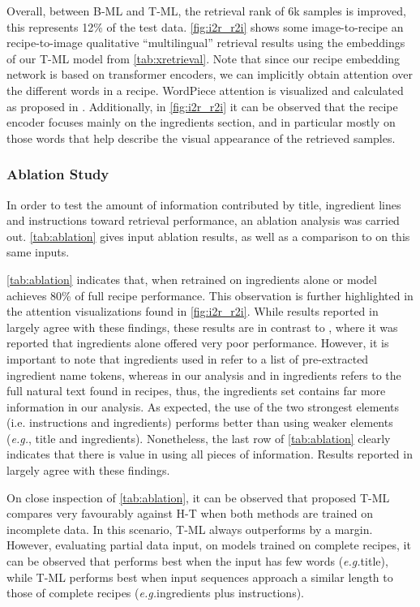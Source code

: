 \documentclass[sigconf,nonacm]{acmart}
\def\eg{\emph{e.g.}} \def\Eg{\emph{E.g.}}
\begin{document}
Overall, between B-ML and T-ML, the retrieval rank of 6k samples is improved, this represents 12\% of the test data. \autoref{fig:i2r_r2i} shows some image-to-recipe an recipe-to-image qualitative ``multilingual'' retrieval results using the embeddings of our  
T-ML model from \autoref{tab:xretrieval}. Note that since our recipe embedding network is based on transformer encoders, we can implicitly obtain attention over the different words in a recipe. WordPiece attention is visualized and calculated as proposed in \cite{Abnar2020}. Additionally, in \autoref{fig:i2r_r2i} it can be observed that the recipe encoder focuses mainly on the ingredients section, and in particular mostly on those words that 
help describe the visual appearance 
of the retrieved samples.



\subsubsection{\textbf{Ablation Study}}

In order to test the amount of information contributed by title, ingredient lines and instructions toward retrieval performance, an ablation analysis was carried out. 
\autoref{tab:ablation} gives input ablation results, as well as a comparison to \cite{salvador2021} on this same inputs. 

\autoref{tab:ablation} indicates that, when retrained on ingredients alone or model achieves 80\% of full recipe performance. This observation is further highlighted in the attention visualizations found in \autoref{fig:i2r_r2i}. While results reported in \cite{salvador2021} largely agree with these findings, these results are in contrast to \cite{chen2018}, where it was reported that ingredients alone offered very poor performance. However, it is important to note that ingredients used in \cite{chen2018} refer to a list of pre-extracted ingredient name tokens, whereas in our analysis and in \cite{salvador2021} ingredients refers to the full 
natural text found in recipes, thus, the ingredients set contains far more information in our analysis. As expected, the use of the two strongest elements (i.e. instructions and ingredients) performs better than using weaker elements (\eg, title and ingredients). Nonetheless, the last row of \autoref{tab:ablation} clearly indicates that there is value in using all pieces of information.
Results reported in \cite{salvador2021} largely agree with these findings.

On close inspection of \autoref{tab:ablation}, it can be observed that proposed T-ML compares very favourably against H-T \cite{salvador2021} when both methods are trained on incomplete data. In this scenario, T-ML always outperforms \cite{salvador2021} by a margin. However, evaluating partial data input, on models trained on complete recipes, it can be observed that \cite{salvador2021} performs best when the input has few words (\eg title), while T-ML performs best when input sequences approach a similar length to those of complete recipes (\eg ingredients plus instructions).
\end{document}

